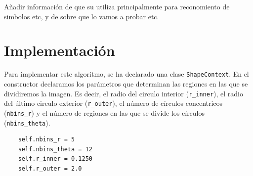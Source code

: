 \documentclass[size=a4, parskip=half, titlepage=false, toc=flat, toc=bib, 12pt]{scrartcl}
\begin{document}
Añadir información de que su utiliza principalmente para reconomiento de simbolos etc, y de sobre que lo vamos a probar etc.

\newpage

\section{Implementación}
Para implementar este algoritmo, se ha declarado una clase \verb|ShapeContext|. En el constructor declaramos los parámetros que determinan las regiones en las que se dividiremos la imagen. Es decir, el radio del circulo interior (\verb|r_inner|), el radio del último circulo exterior (\verb|r_outer|), el número de círculos concentricos (\verb|nbins_r|) y el número de regiones en las que se divide los círculos (\verb|nbins_theta|).

\begin{verbatim}
    self.nbins_r = 5
    self.nbins_theta = 12
    self.r_inner = 0.1250
    self.r_outer = 2.0
\end{verbatim}
\end{document}
